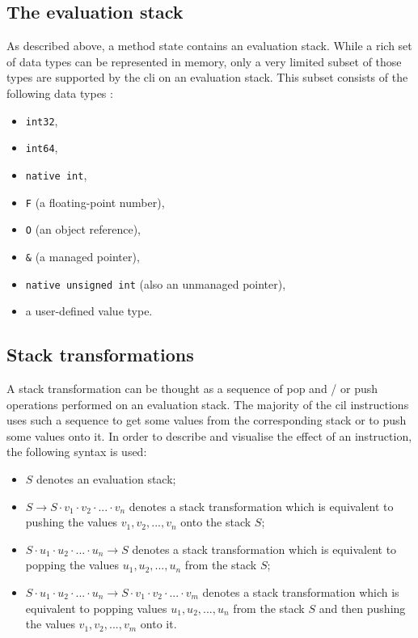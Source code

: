 \documentclass{article}
\numberwithin{equation}{section}
\begin{document}
\subsection{The evaluation stack}

As described above, a method state contains an evaluation stack. While a rich set of data types can be represented in memory, only a very limited subset of those types are supported by the \acrshort{cli} on an evaluation stack. This subset consists of the following data types \cite{ecmaStandard}:
\begin{itemize}
	\item{\texttt{int32},}
	\item{\texttt{int64},}
	\item{\texttt{native int},}
	\item{\texttt{F} (a floating-point number),}
	\item{\texttt{O} (an object reference),}
	\item{\texttt{\&} (a managed pointer),}
	\item{\texttt{native unsigned int} (also an unmanaged pointer),}
	\item{a user-defined value type.}
\end{itemize}

\subsection{Stack transformations}
\label{sec:stackTransformations}

A stack transformation can be thought as a sequence of pop and / or push operations performed on an evaluation stack. The majority of the \acrshort{cil} instructions uses such a sequence to get some values from the corresponding stack or to push some values onto it. In order to describe and visualise the effect of an instruction, the following syntax is used:
\begin{itemize}
	\item{$S$ denotes an evaluation stack;}
	\item{$S \rightarrow S \cdot v_1 \cdot v_2 \cdot ... \cdot v_n$ denotes a stack transformation which is equivalent to pushing the values $v_1, v_2, ..., v_n$ onto the stack $S$;}
	\item{$S \cdot u_1 \cdot u_2 \cdot ... \cdot u_n \rightarrow S$ denotes a stack transformation which is equivalent to popping the values $u_1, u_2, ..., u_n$ from the stack $S$;}
	\item{$S \cdot u_1 \cdot u_2 \cdot ... \cdot u_n \rightarrow S \cdot v_1 \cdot v_2 \cdot ... \cdot v_m$ denotes a stack transformation which is equivalent to popping values $u_1, u_2, ..., u_n$ from the stack $S$ and then pushing the values $v_1, v_2, ..., v_m$ onto it.}
\end{itemize}
\end{document}
